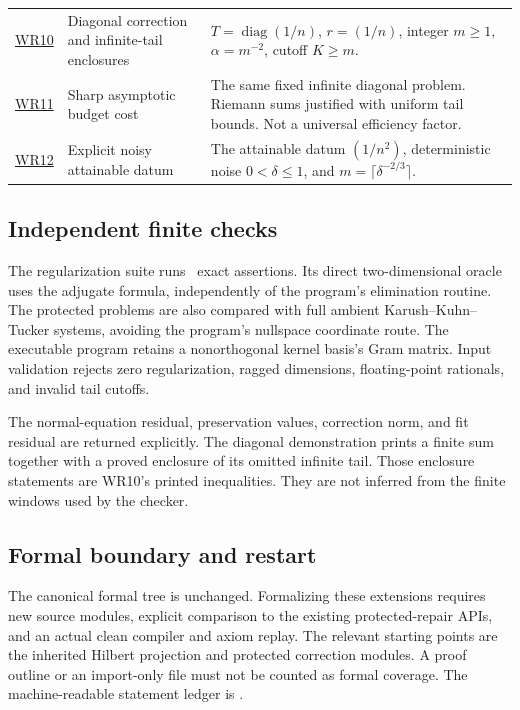\begin{longtable}{@{}p{.10\linewidth}p{.38\linewidth}p{.43\linewidth}@{}}
\hyperref[WR10]{WR10} & Diagonal correction and infinite-tail enclosures & $T=\operatorname{diag}(1/n)$, $r=(1/n)$, integer $m\ge1$, $\alpha=m^{-2}$, cutoff $K\ge m$.\\[5pt]
\hyperref[WR11]{WR11} & Sharp asymptotic budget cost & The same fixed infinite diagonal problem. Riemann sums justified with uniform tail bounds. Not a universal efficiency factor.\\[5pt]
\hyperref[WR12]{WR12} & Explicit noisy attainable datum & The attainable datum $(1/n^2)$, deterministic noise $0<\delta\le1$, and $m=\lceil\delta^{-2/3}\rceil$.\\[5pt]
\bottomrule\end{longtable}
\subsection{Independent finite checks}
The regularization suite runs \EditionRegularizationChecks\ exact assertions. Its direct two-dimensional oracle uses the adjugate formula, independently of the program's elimination routine. The protected problems are also compared with full ambient Karush--Kuhn--Tucker systems, avoiding the program's nullspace coordinate route. The executable program retains a nonorthogonal kernel basis's Gram matrix. Input validation rejects zero regularization, ragged dimensions, floating-point rationals, and invalid tail cutoffs.

The normal-equation residual, preservation values, correction norm, and fit residual are returned explicitly. The diagonal demonstration prints a finite sum together with a proved enclosure of its omitted infinite tail. Those enclosure statements are WR10's printed inequalities. They are not inferred from the finite windows used by the checker.

\subsection{Formal boundary and restart}
The canonical formal tree is unchanged. Formalizing these extensions requires new source modules, explicit comparison to the existing protected-repair APIs, and an actual clean compiler and axiom replay. The relevant starting points are the inherited Hilbert projection and protected correction modules. A proof outline or an import-only file must not be counted as formal coverage. The machine-readable statement ledger is .

